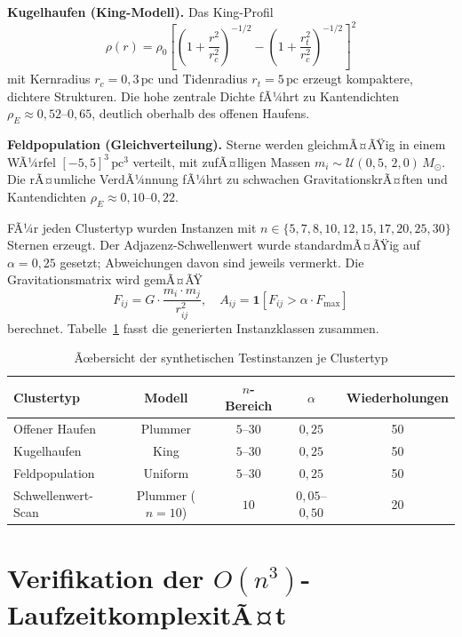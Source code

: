 ﻿\documentclass[a4paper,12pt]{report}
\theoremstyle{definition}
\begin{document}
\textbf{Kugelhaufen (King-Modell).} Das King-Profil
\[
    \rho(r) = \rho_0 \left[\left(1 + \frac{r^2}{r_c^2}\right)^{-1/2} - \left(1 + \frac{r_t^2}{r_c^2}\right)^{-1/2}\right]^2
\]
mit Kernradius $r_c = 0{,}3\,\mathrm{pc}$ und Tidenradius $r_t = 5\,\mathrm{pc}$ erzeugt kompaktere, dichtere Strukturen. Die hohe zentrale Dichte fÃ¼hrt zu Kantendichten $\rho_E \approx 0{,}52$--$0{,}65$, deutlich oberhalb des offenen Haufens.

\textbf{Feldpopulation (Gleichverteilung).} Sterne werden gleichmÃ¤ÃŸig in einem WÃ¼rfel $[-5,5]^3\,\mathrm{pc}^3$ verteilt, mit zufÃ¤lligen Massen $m_i \sim \mathcal{U}(0{,}5,\,2{,}0)\,M_\odot$. Die rÃ¤umliche VerdÃ¼nnung fÃ¼hrt zu schwachen GravitationskrÃ¤ften und Kantendichten $\rho_E \approx 0{,}10$--$0{,}22$.

FÃ¼r jeden Clustertyp wurden Instanzen mit $n \in \{5, 7, 8, 10, 12, 15, 17, 20, 25, 30\}$ Sternen erzeugt. Der Adjazenz-Schwellenwert wurde standardmÃ¤ÃŸig auf $\alpha = 0{,}25$ gesetzt; Abweichungen davon sind jeweils vermerkt. Die Gravitationsmatrix wird gemÃ¤ÃŸ
\[
    F_{ij} = G \cdot \frac{m_i \cdot m_j}{r_{ij}^2}, \quad A_{ij} = \mathbf{1}[F_{ij} > \alpha \cdot F_{\max}]
\]
berechnet. Tabelle~\ref{tab:instanzen} fasst die generierten Instanzklassen zusammen.

\begin{table}[H]
\centering
\caption{Ãœbersicht der synthetischen Testinstanzen je Clustertyp}
\label{tab:instanzen}
\begin{tabular}{lcccc}
\toprule
Clustertyp & Modell & $n$-Bereich & $\alpha$ & Wiederholungen \\
\midrule
Offener Haufen   & Plummer & $5$--$30$ & $0{,}25$ & 50 \\
Kugelhaufen      & King    & $5$--$30$ & $0{,}25$ & 50 \\
Feldpopulation   & Uniform & $5$--$30$ & $0{,}25$ & 50 \\
Schwellenwert-Scan & Plummer ($n=10$) & $10$ & $0{,}05$--$0{,}50$ & 20 \\
\bottomrule
\end{tabular}
\end{table}

\section{Verifikation der $O(n^3)$-LaufzeitkomplexitÃ¤t}
\label{sec:empirie_laufzeit}
\end{document}
